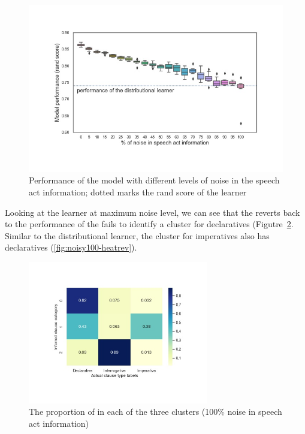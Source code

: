 \begin{figure}[H]
    \centering
    \includegraphics[width=1\textwidth]{figures/noisy-rand-compare.jpg}
    \caption{Performance of the \plearnerabbr{} model with different levels of noise in the speech act information; dotted marks the rand score of the \dlearnerabbr{} learner}
    \label{fig:noisy-rand-compare}
\end{figure}


Looking at the learner at maximum noise level, we can see that the \plearnerabbr{} reverts back to the performance of the \dlearnerabbr{} fails to identify a cluster for declaratives (Figutre~\ref{fig:noisy100-heatmap}. Similar to the distributional learner, the cluster for imperatives also has declaratives (\ref{fig:noisy100-heatrev}). 



\begin{figure}[H]
    \centering
    \includegraphics[width=0.7\textwidth]{figures/noisy100-heatmap.jpg}
    \caption{The proportion of \diis{} in each of the three clusters (100\% noise in speech act information) }
    \label{fig:noisy100-heatmap}
\end{figure}

